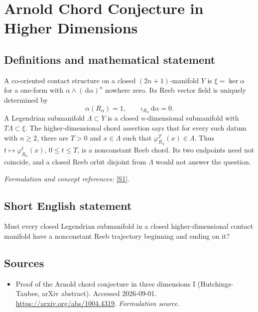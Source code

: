 \documentclass[11pt]{article}
\begin{document}
\section*{\texorpdfstring{Arnold Chord Conjecture in Higher Dimensions}{Arnold Chord Conjecture in Higher Dimensions}}\label{331}
\subsection{Definitions and mathematical statement}
A co-oriented contact structure on a closed $(2n+1)$-manifold $Y$ is $\xi=\ker\alpha$ for a one-form with $\alpha\wedge({\,\mathrm{d}}\alpha)^n$ nowhere zero. Its Reeb vector field is uniquely determined by
\[
 \alpha(R_\alpha)=1,\qquad \iota_{R_\alpha}{\,\mathrm{d}}\alpha=0.
\]
A Legendrian submanifold $\Lambda\subset Y$ is a closed $n$-dimensional submanifold with $T\Lambda\subset\xi$. The higher-dimensional chord assertion says that for every such datum with $n\ge2$, there are $T>0$ and $x\in\Lambda$ such that $\varphi_{R_\alpha}^T(x)\in\Lambda$. Thus $t\mapsto\varphi_{R_\alpha}^t(x)$, $0\le t\le T$, is a nonconstant Reeb chord. Its two endpoints need not coincide, and a closed Reeb orbit disjoint from $\Lambda$ would not answer the question.
\par\smallskip\textit{Formulation and concept references:} \href{https://arxiv.org/abs/1004.4319}{[S1]}.

\subsection{Short English statement}
Must every closed Legendrian submanifold in a closed higher-dimensional contact manifold have a nonconstant Reeb trajectory beginning and ending on it?
\subsection{Sources}
\begin{itemize}
\item[S1]Proof of the Arnold chord conjecture in three dimensions I (Hutchings-Taubes, arXiv abstract). Accessed 2026-09-01.
\url{https://arxiv.org/abs/1004.4319}.
\textit{Formulation source.}
\end{itemize}
\end{document}
